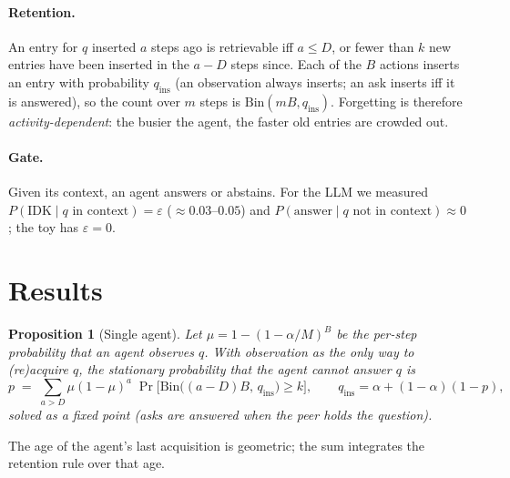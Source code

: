 \documentclass[10pt]{article}
\newtheorem{proposition}{Proposition}
\begin{document}
\paragraph{Retention.} An entry for $q$ inserted $a$ steps ago is retrievable iff $a \le D$, or fewer than $k$ new entries have been inserted in the $a - D$ steps since. Each of the $B$ actions inserts an entry with probability $q_{\mathrm{ins}}$ (an observation always inserts; an ask inserts iff it is answered), so the count over $m$ steps is $\mathrm{Bin}(mB, q_{\mathrm{ins}})$. Forgetting is therefore \emph{activity-dependent}: the busier the agent, the faster old entries are crowded out.

\paragraph{Gate.} Given its context, an agent answers or abstains. For the LLM we measured $P(\text{IDK} \mid q \text{ in context}) = \varepsilon$ ($\approx 0.03$--$0.05$) and $P(\text{answer} \mid q \text{ not in context}) \approx 0$; the toy has $\varepsilon = 0$.

\section{Results}

\begin{proposition}[Single agent]
Let $\mu = 1 - (1-\alpha/M)^B$ be the per-step probability that an agent observes $q$. With observation as the only way to (re)acquire $q$, the stationary probability that the agent cannot answer $q$ is
\begin{equation}
p \;=\; \sum_{a > D} \mu(1-\mu)^a \; \Pr\!\big[\mathrm{Bin}\big((a-D)B,\, q_{\mathrm{ins}}\big) \ge k\big],
\qquad q_{\mathrm{ins}} = \alpha + (1-\alpha)(1-p),
\label{eq:renewal}
\end{equation}
solved as a fixed point (asks are answered when the peer holds the question).
\end{proposition}
\noindent The age of the agent's last acquisition is geometric; the sum integrates the retention rule over that age.
\end{document}
